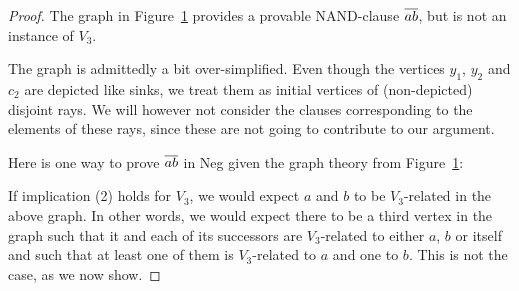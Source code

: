\begin{proof}
The graph in Figure~\ref{fig:v3_counter_graph} provides a provable NAND-clause $\ol{ab}$, but is not an instance of $V_3$.\par
\begin{figure}[!h]
  \centering
  \caption{}
  \label{fig:v3_counter_graph}
\end{figure}
\FloatBarrier
The graph is admittedly a bit over-simplified.
Even though the vertices $y_1$, $y_2$ and $c_2$ are depicted like sinks, we treat them as initial vertices of (non-depicted) disjoint rays.
We will however not consider the clauses corresponding to the elements of these rays, since these are not going to contribute to our argument.

Here is one way to prove $\ol{ab}$ in Neg given the graph theory from Figure~\ref{fig:v3_counter_graph}:\par
\begin{figure}[!h]
  \centering
  \begin{prooftree*}
  \end{prooftree*}
  \caption{}
  \label{fig:v3_counter_proof}
\end{figure}
\FloatBarrier
If implication (2) holds for $V_3$, we would expect $a$ and $b$ to be $V_3$-related in the above graph.
In other words, we would expect there to be a third vertex in the graph such that it and each of its successors are $V_3$-related to either $a$, $b$ or itself and such that at least one of them is $V_3$-related to $a$ and one to $b$.
This is not the case, as we now show.


\end{proof}
